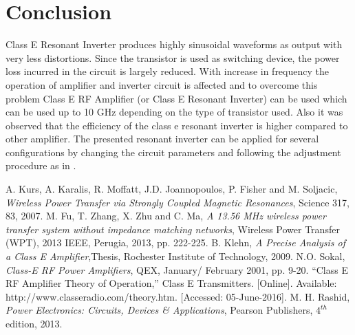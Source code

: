 \documentclass[journal,twoside]{IEEEtran}
\begin{document}
\section{Conclusion}
Class E Resonant Inverter produces highly sinusoidal
waveforms as output with very less distortions. Since the
transistor is used as switching device, the power loss incurred
in the circuit is largely reduced. With increase in frequency
the operation of amplifier and inverter circuit is affected and
to overcome this problem Class E RF Amplifier (or Class E
Resonant Inverter) can be used which can be used up to 10
GHz depending on the type of transistor used. Also it was
observed that the efficiency of the class e resonant inverter is
higher compared to other amplifier. The presented resonant
inverter can be applied for several configurations by changing
the circuit parameters and following the adjustment procedure
as in \cite{Sokal2001}.


\begin{thebibliography}{9}

    A. Kurs, A. Karalis, R. Moffatt, J.D. Joannopoulos, P. Fisher and M. Soljacic, \textit{Wireless Power Transfer
    via Strongly Coupled Magnetic Resonances}, Science 317, 83, 2007.
    M. Fu, T. Zhang, X. Zhu and C. Ma, \textit{A 13.56 MHz wireless power transfer system without impedance
    matching networks}, Wireless Power Transfer (WPT), 2013 IEEE, Perugia, 2013, pp. 222-225.
    B. Klehn, \textit{A Precise Analysis of a Class E Amplifier},Thesis, Rochester Institute of Technology, 2009.
    N.O. Sokal, \textit{Class-E RF Power Amplifiers}, QEX, January/ February 2001, pp. 9-20.
    “Class E RF Amplifier Theory of Operation,” Class E Transmitters. 
    [Online]. Available: http://www.classeradio.com/theory.htm. [Accessed: 05-June-2016].
    M. H. Rashid, \textit{Power Electronics: Circuits, Devices \& Applications}, Pearson Publishers, $4^{th}$ edition, 2013.

\end{thebibliography}
\end{document}
